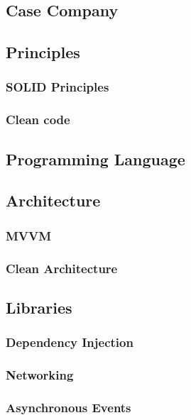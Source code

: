\subsection{Case Company}

\subsection{Principles}
\subsubsection{SOLID Principles}
\label{section:4.2.1}
\subsubsection{Clean code}
\label{section:4.2.2}

\subsection{Programming Language}
\label{section:4.3}

\subsection{Architecture}
\subsubsection{MVVM}
\label{section:4.4.1}
\subsubsection{Clean Architecture}
\label{section:4.4.2}

\subsection{Libraries}


\subsubsection{Dependency Injection}
\label{section:4.5.1}
\subsubsection{Networking}
\label{section:4.5.2}
\subsubsection{Asynchronous Events}
\label{section:4.5.3}
